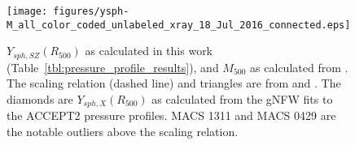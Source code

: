 \documentclass[iop,numberedappendix,apj]{emulateapj}
\begin{document}




\begin{figure}[!ht]
  \begin{center}
  \texttt{[image: figures/ysph-M\_all\_color\_coded\_unlabeled\_xray\_18\_Jul\_2016\_connected.eps]}
  \end{center}
  \caption{$Y_{sph,SZ}(R_{500})$ as calculated in this work (Table~\ref{tbl:pressure_profile_results}),
  and $M_{500}$ as calculated from \citet{mantz2010}. The scaling relation (dashed line) and triangles
  are from \citet{arnaud2010} and \citet{pratt2010}. The diamonds are $Y_{sph,X}(R_{500})$ as calculated from the gNFW fits
  to the ACCEPT2 pressure profiles. MACS 1311 and MACS 0429 are the notable outliers above the scaling relation.}
  \label{fig:ysph_scaling}
\end{figure}
\end{document}
